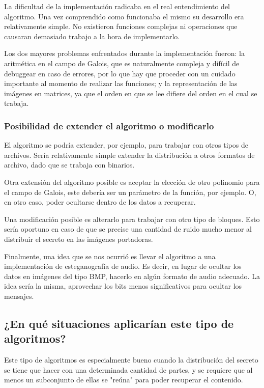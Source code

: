 \documentclass[11pt]{scrartcl} %
\begin{document}
La dificultad de la implementación radicaba en el real entendimiento del algoritmo. Una vez comprendido como funcionaba el mismo su desarrollo era relativamente simple. No existieron funciones complejas ni operaciones que causaran demasiado trabajo a la hora de implementarlo.

Los dos mayores problemas enfrentados durante la implementación fueron: la aritmética en el campo de Galois, que es naturalmente compleja y difícil de debuggear en caso de errores, por lo que hay que proceder con un cuidado importante al momento de realizar las funciones; y la representación de las imágenes en matrices, ya que el orden en que se lee difiere del orden en el cual se trabaja.

\subsubsection{Posibilidad de extender el algoritmo o modificarlo}

El algoritmo se podría extender, por ejemplo, para trabajar con otros tipos de archivos. Sería relativamente simple extender la distribución a otros formatos de archivo, dado que se trabaja con binarios.

Otra extensión del algoritmo posible es aceptar la elección de otro polinomio para el campo de Galois, este debería ser un parámetro de la función, por ejemplo. O, en otro caso, poder ocultarse dentro de los datos a recuperar.

Una modificación posible es alterarlo para trabajar con otro tipo de bloques. Esto sería oportuno en caso de que se precise una cantidad de ruido mucho menor al distribuir el secreto en las imágenes portadoras.

Finalmente, una idea que se nos ocurrió es llevar el algoritmo a una implementación de esteganografía de audio. Es decir, en lugar de ocultar los datos en imágenes del tipo BMP, hacerlo en algún formato de audio adecuado. La idea sería la misma, aprovechar los bits menos significativos para ocultar los mensajes.

\subsection{¿En qué situaciones aplicarían este tipo de algoritmos?}

Este tipo de algoritmos es especialmente bueno cuando la distribución del secreto se tiene que hacer con una determinada cantidad de partes, y se requiere que al menos un subconjunto de ellas se "reúna" para poder recuperar el contenido.
\end{document}
